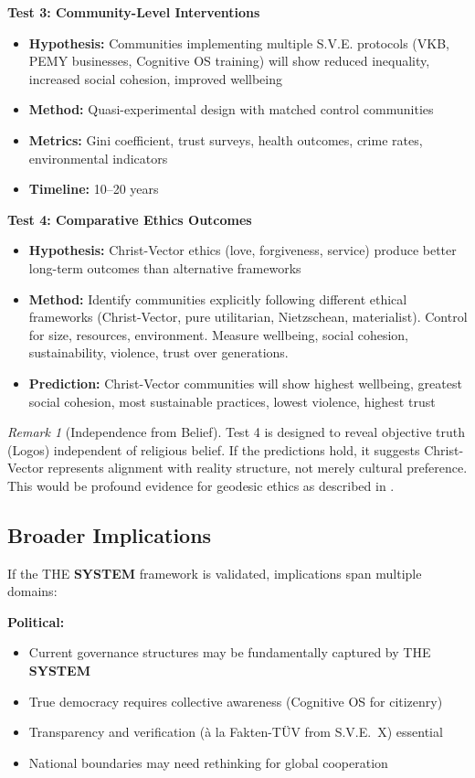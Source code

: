 \documentclass[11pt,a4paper]{article}
\newcommand{\SYSTEM}{\textbf{SYSTEM}}
\theoremstyle{definition}
\theoremstyle{remark}
\newtheorem{remark}{Remark}[section]
\begin{document}
\textbf{Test 3: Community-Level Interventions}
\begin{itemize}
    \item \textbf{Hypothesis:} Communities implementing multiple S.V.E. protocols (VKB, PEMY businesses, Cognitive OS training) will show reduced inequality, increased social cohesion, improved wellbeing
    \item \textbf{Method:} Quasi-experimental design with matched control communities
    \item \textbf{Metrics:} Gini coefficient, trust surveys, health outcomes, crime rates, environmental indicators
    \item \textbf{Timeline:} 10--20 years
\end{itemize}

\textbf{Test 4: Comparative Ethics Outcomes}
\begin{itemize}
    \item \textbf{Hypothesis:} Christ-Vector ethics (love, forgiveness, service) produce better long-term outcomes than alternative frameworks
    \item \textbf{Method:} Identify communities explicitly following different ethical frameworks (Christ-Vector, pure utilitarian, Nietzschean, materialist). Control for size, resources, environment. Measure wellbeing, social cohesion, sustainability, violence, trust over generations.
    \item \textbf{Prediction:} Christ-Vector communities will show highest wellbeing, greatest social cohesion, most sustainable practices, lowest violence, highest trust
\end{itemize}

\begin{remark}[Independence from Belief]
Test 4 is designed to reveal objective truth (Logos) independent of religious belief. If the predictions hold, it suggests Christ-Vector represents alignment with reality structure, not merely cultural preference. This would be profound evidence for geodesic ethics as described in \cite{sve4,sve8}.
\end{remark}

\subsection{Broader Implications}

If the THE \SYSTEM{} framework is validated, implications span multiple domains:

\textbf{Political:}
\begin{itemize}
    \item Current governance structures may be fundamentally captured by THE \SYSTEM{}
    \item True democracy requires collective awareness (Cognitive OS for citizenry)
    \item Transparency and verification (à la Fakten-TÜV from S.V.E.~X) essential
    \item National boundaries may need rethinking for global cooperation
\end{itemize}
\end{document}
